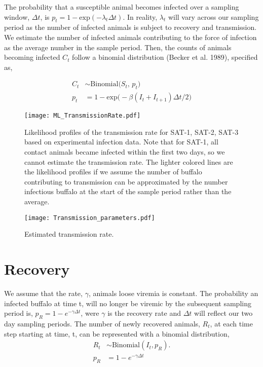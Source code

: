 \documentclass[letterpaper,12pt]{article}
\begin{document}
The probability that a susceptible animal becomes infected over a sampling window, $\Delta t$, is $p_t = 1 - \text{exp}(- \lambda_t \Delta t)$.
In reality, $\lambda_t$ will vary across our sampling period as the number of infected animals is subject to recovery and transmission.  
We estimate the number of infected animals contributing to the force of infection as the average number in the sample period.
Then, the counts of animals becoming infected $C_t$ follow a binomial distribution (Becker et al. 1989), specified as, 

\begin{align}
C_t &\sim \text{Binomial} \Big( S_t \text{, }p_t\Big) \nonumber \\  %
p_t &= 1 - \text{exp}\Big(-\beta (I_t + I_{t+1})\Delta t / 2 \Big)
\end{align}

\begin{figure}[h]
\begin{center}
\texttt{[image: ML\_TransmissionRate.pdf]}
\caption{Likelihood profiles of the transmission rate for SAT-1, SAT-2, SAT-3 based on experimental infection data.  Note that for SAT-1, all contact animals became infected within the first two days, so we cannot estimate the transmission rate.  The lighter colored lines are the likelihood profiles if we assume the number of buffalo contributing to transmission can be approximated by the number infectious buffalo at the start of the sample period rather than the average.}
\end{center}
\end{figure}

\begin{figure}[h]
\begin{center}
\texttt{[image: Transmission\_parameters.pdf]}
\caption{Estimated transmission rate.}
\end{center}
\end{figure}


\clearpage
\section{Recovery} 
We assume that the rate, $\gamma$, animals loose viremia is constant.
The probability an infected buffalo at time t, will no longer be viremic by the subsequent sampling period is, $p_R = 1- e^{- \gamma \Delta t}$, were $\gamma$ is the recovery rate and $\Delta t$ will reflect our two day sampling periods.  
The number of newly recovered animals, $R_{t}$, at each time step starting at time, t, can be represented with a binomial distribution, 
\begin{align}
R_{t} &\sim \text{Binomial}(I_{t}  , p_R). \nonumber \\
p_R &= 1- e^{- \gamma \Delta t}
\end{align}
\end{document}
